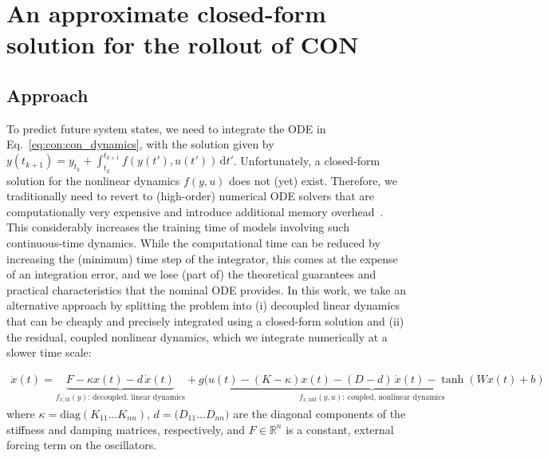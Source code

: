 \section{An approximate closed-form solution for the rollout of CON}

\subsection{Approach}\label{sub:con:cfa:approach}
To predict future system states, we need to integrate the ODE in Eq.~\eqref{eq:con:con_dynamics}, with the solution given by $y(t_{k+1}) = y_{t_k} + \int_{t_k}^{t_{k+1}} f(y(t'), u(t')) \, \mathrm{d}t'$.
Unfortunately, a closed-form solution for the nonlinear dynamics $f(y, u)$ does not (yet) exist. Therefore, we traditionally need to revert to (high-order) numerical \gls{ODE} solvers that are computationally very expensive and introduce additional memory overhead~\cite{kidger2021neural}. This considerably increases the training time of models involving such continuous-time dynamics.
While the computational time can be reduced by increasing the (minimum) time step of the integrator, this comes at the expense of an integration error, and we lose (part of) the theoretical guarantees and practical characteristics that the nominal \gls{ODE} provides.
In this work, we take an alternative approach by splitting the problem into (i) decoupled linear dynamics that can be cheaply and precisely integrated using a closed-form solution and (ii) the residual, coupled nonlinear dynamics, which we integrate numerically at a slower time scale:

\begin{equation}\label{eq:con:con_split_linear_terms}
\begin{split}
    \ddot{x}(t) = \underbrace{F -\kappa x(t) - d \, \dot{x}(t)}_{f_{\ddot{x}, \mathrm{ld}}(y): \, \text{decoupled, linear dynamics}} + \underbrace{g(u(t)-(K-\kappa) x(t) - (D-d) \, \dot{x}(t) - \tanh(W x(t) + b)}_{f_{\ddot{x}, \mathrm{nld}}(y, u): \: \text{coupled, nonlinear dynamics}}
\end{split}
\end{equation}
where $\kappa = \mathrm{diag}(K_{11} \dots K_{nn})$, $d = \mathrm(D_{11} \dots D_{nn})$ are the diagonal components of the stiffness and damping matrices, respectively, and $F \in \mathbb{R}^{n}$ is a constant, external forcing term on the oscillators.

